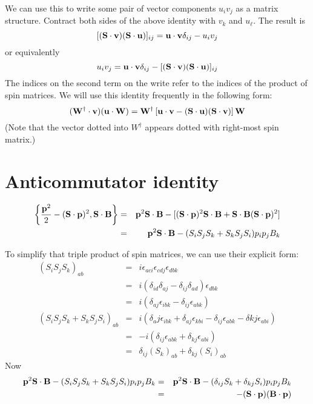 We can use this to write some pair of vector components $u_i v_j$ as a matrix structure.  Contract both sides of the above identity with $v_k$ and $u_\ell$.  The result is
\[
	[(\mathbf{S} \cdot \mathbf{v} )(\mathbf{S} \cdot \mathbf{u})]_{ij}
		= \mathbf{u} \cdot \mathbf{v} \delta_{ij} - u_i v_j 
\]
or equivalently
\[
	u_i v_j = \mathbf{u} \cdot \mathbf{v} \delta_{ij}  - [(\mathbf{S} \cdot \mathbf{v} )(\mathbf{S} \cdot \mathbf{u})]_{ij}
\]
The indices on the second term on the write refer to the indices of the product of spin matrices.  We will use this identity frequently in the following form:
\[
	(\mathbf{W^\dagger} \cdot \mathbf{v} )( \mathbf{u} \cdot \mathbf{W} )
		=	\mathbf{W^\dagger} \left[ \mathbf{u} \cdot \mathbf{v} - (\mathbf{S} \cdot \mathbf{u} )(\mathbf{S} \cdot \mathbf{v}) \right ] \mathbf{W}
\]
(Note that the vector dotted into $W^\dagger$ appears dotted with right-most spin matrix.)


\section{Anticommutator identity}
\begin{eqnarray*}
\left \{ \frac{\mathbf{p}^2}{2} - (\mathbf{S} \cdot \mathbf{p})^2, \mathbf{S} \cdot \mathbf{B} \right \}
	&=&	 \mathbf{p}^2 \mathbf{S} \cdot \mathbf{B} - [(\mathbf{S} \cdot \mathbf{p})^2 \mathbf{S} \cdot \mathbf{B} + \mathbf{S} \cdot \mathbf{B} (\mathbf{S} \cdot \mathbf{p})^2  ]	\\
	&=&	 \mathbf{p}^2 \mathbf{S} \cdot \mathbf{B} - (S_i S_j S_k + S_k S_j S_i) p_i p_j B_k
\end{eqnarray*}

To simplify that triple product of spin matrices, we can use their explicit form:
\begin{eqnarray*}
	(S_i S_j S_k )_{ab}
		&=&	i\epsilon_{aci}\epsilon_{cdj}\epsilon_{dbk}	\\
		&=&	i(\delta_{id} \delta_{aj} - \delta_{ij} \delta_{ad})\epsilon_{dbk}	\\
		&=&	i(\delta_{aj} \epsilon_{ibk} - \delta_{ij} \epsilon_{abk})		\\
	(S_i S_j S_k + S_k S_j S_i)_{ab}
		&=& i(\delta_aj \epsilon_{ibk} + \delta_{aj} \epsilon_{kbi} -\delta_{ij} \epsilon_{abk} -\delta{kj}\epsilon_{abi})	\\
		&=& -i(\delta_{ij} \epsilon_{abk} + \delta_{kj} \epsilon_{abi})	\\
		&=&	\delta_{ij} {(S_k)}_{ab} + \delta_{kj} {(S_i)}_{ab}	
\end{eqnarray*}
Now 
\begin{eqnarray*}
 \mathbf{p}^2 \mathbf{S} \cdot \mathbf{B} - (S_i S_j S_k + S_k S_j S_i) p_i p_j B_k
 	&=& \mathbf{p}^2 \mathbf{S} \cdot \mathbf{B} - (\delta_{ij} S_k + \delta_{kj} S_i	) p_i p_j B_k	\\
 	&=& - (\mathbf{S} \cdot \mathbf{p}) (\mathbf{B} \cdot \mathbf{p})
\end{eqnarray*}